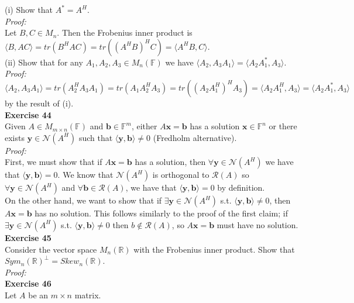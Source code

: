 \documentclass[letterpaper,12pt]{article}
\let\vec\mathbf
\theoremstyle{definition}
\begin{document}
(i) Show that $A^* = A^H$. \\
\textit{Proof:} \\
Let $B, C \in M_n$. Then the Frobenius inner product is
$\langle B, AC \rangle = tr(B^HAC) = tr((A^HB)^HC) = \langle A^HB, C \rangle$. \\

(ii) Show that for any $A_1, A_2, A_3 \in M_n(\mathbb{F})$ we have $\langle A_2, A_3A_1 \rangle = \langle A_2A_1^*, A_3 \rangle$. \\
\textit{Proof:} \\
$\langle A_2, A_3A_1 \rangle = tr(A_2^HA_3A_1) = tr(A_1A_2^HA_3) = tr((A_2A_1^H)^HA_3) = \langle A_2A_1^H, A_3 \rangle = \langle A_2A_1^*, A_3 \rangle$ by the result of (i). \\

\textbf{Exercise 44} \\
Given $A \in M_{m \times n}(\mathbb{F})$ and $\vec{b} \in \mathbb{F}^m$, either $A\vec{x} = \vec{b}$ has a solution $\vec{x} \in \mathbb{F}^n$ or there exists $\vec{y} \in \mathscr{N}(A^H)$ such that $\langle \vec{y}, \vec{b} \rangle \neq 0$ (Fredholm alternative). \\
\textit{Proof:} \\
First, we must show that if $A\vec{x} = \vec{b}$ has a solution, then $\forall \vec{y} \in \mathscr{N}(A^H)$ we have that $\langle \vec{y}, \vec{b} \rangle = 0$. We know that $\mathscr{N}(A^H)$ is orthogonal to $\mathscr{R}(A)$ so $\forall \vec{y} \in \mathscr{N}(A^H)$ and $\forall \vec{b} \in \mathscr{R}(A)$, we have that $\langle \vec{y}, \vec{b} \rangle = 0$ by definition. \\
On the other hand, we want to show that if $\exists \vec{y} \in \mathscr{N}(A^H)$ s.t. $\langle \vec{y}, \vec{b} \rangle \neq 0$, then $A\vec{x} = \vec{b}$ has no solution. This follows similarly to the proof of the first claim; if $\exists \vec{y} \in \mathscr{N}(A^H)$  s.t. $\langle \vec{y}, \vec{b} \rangle \neq 0$ then $b \notin \mathscr{R}(A)$, so $A\vec{x} = \vec{b}$ must have no solution. \\

\textbf{Exercise 45} \\
Consider the vector space $M_n(\mathbb{R})$ with the Frobenius inner product. Show that $Sym_n(\mathbb{R})^\perp = Skew_n(\mathbb{R})$. \\
\textit{Proof:} \\

\textbf{Exercise 46} \\
Let $A$ be an $m \times n$ matrix. \\
\end{document}
